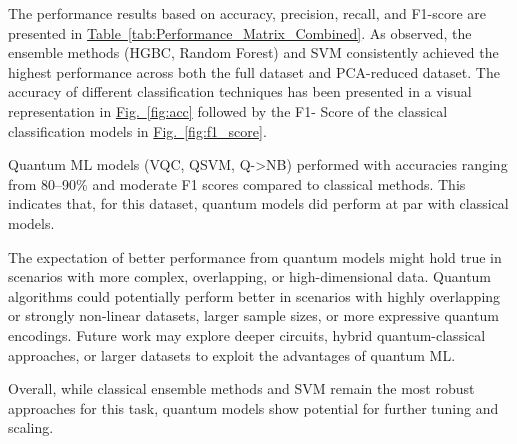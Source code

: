 \documentclass[runningheads]{llncs}
\begin{document}
The performance results based on accuracy, precision, recall, and F1-score are presented in \hyperref[tab:Performance_Matrix_Combined]{Table~\ref{tab:Performance_Matrix_Combined}}. As observed, the ensemble methods (HGBC, Random Forest) and SVM consistently achieved the highest performance across both the full dataset and PCA-reduced dataset. The accuracy of different classification techniques has been presented in a visual representation in \hyperref[fig:acc]{Fig.~\ref{fig:acc}} followed by the F1- Score of the classical classification models in \hyperref[fig:f1_score]{Fig.~\ref{fig:f1_score}}.

Quantum ML models (VQC, QSVM, Q->NB) performed with accuracies ranging from 80--90\% and moderate F1 scores compared to classical methods. This indicates that, for this dataset, quantum models did perform at par with classical models.

The expectation of better performance from quantum models might hold true in scenarios with more complex, overlapping, or high-dimensional data. 
Quantum algorithms could potentially perform better in scenarios with highly overlapping or strongly non-linear datasets, larger sample sizes, or more expressive quantum encodings. Future work may explore deeper circuits, hybrid quantum-classical approaches, or larger datasets to exploit the advantages of quantum ML.

Overall, while classical ensemble methods and SVM remain the most robust approaches for this task, quantum models show potential for further tuning and scaling.
\end{document}
